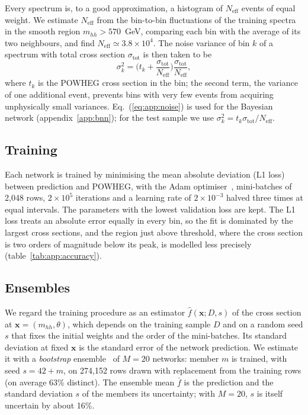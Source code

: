 Every spectrum is, to a good approximation, a histogram of $N_\text{eff}$ events of equal
weight. We estimate $N_\text{eff}$ from the bin-to-bin fluctuations of the training
spectra in the smooth region $m_{hh} > 570$~GeV, comparing each bin with the average of its
two neighbours, and find $N_\text{eff} \simeq 3.8 \times 10^4$. The noise variance of bin
$k$ of a spectrum with total cross section $\sigma_\text{tot}$ is then taken to be
\begin{equation}
  \sigma_k^2 = \Big(t_k + \frac{\sigma_\text{tot}}{N_\text{eff}}\Big)
               \frac{\sigma_\text{tot}}{N_\text{eff}} ,
  \label{eq:app:noise}
\end{equation}
where $t_k$ is the POWHEG cross section in the bin; the second term, the variance of one
additional event, prevents bins with very few events from acquiring unphysically small
variances. Eq.~(\ref{eq:app:noise}) is used for the Bayesian network (appendix~\ref{app:bnn}); for
the test sample we use $\sigma_k^2 = t_k \sigma_\text{tot}/N_\text{eff}$.

\subsection{Training}
\label{app:training}

Each network is trained by minimising the mean absolute deviation (L1 loss) between
prediction and POWHEG, with the Adam optimiser~\cite{Kingma:2014vow}, mini-batches of 2,048
rows, $2 \times 10^5$ iterations and a learning rate of $2 \times 10^{-3}$ halved three
times at equal intervals. The parameters with the lowest validation loss are kept. The L1
loss treats an absolute error equally in every bin, so the fit is dominated by the largest
cross sections, and the region just above threshold, where the cross section is two orders
of magnitude below its peak, is modelled less precisely (table~\ref{tab:app:accuracy}).

\subsection{Ensembles}
\label{app:ensembles}

We regard the training procedure as an estimator $\hat f(\boldsymbol{x}; D, s)$ of the
cross section at $\boldsymbol{x} = (m_{hh}, \theta)$, which depends on the training sample
$D$ and on a random seed $s$ that fixes the initial weights and the order of the
mini-batches. Its standard deviation at fixed $\boldsymbol{x}$ is the standard error of the
network prediction. We estimate it with a \emph{bootstrap}
ensemble~\cite{Efron:1979,Efron:1993} of $M = 20$ networks: member $m$ is trained, with
seed $s = 42 + m$, on 274,152 rows drawn with replacement from the training rows (on
average 63\% distinct). The ensemble mean $\bar f$ is the prediction and the standard
deviation $s$ of the members its uncertainty; with $M = 20$, $s$ is itself uncertain by
about 16\%.

